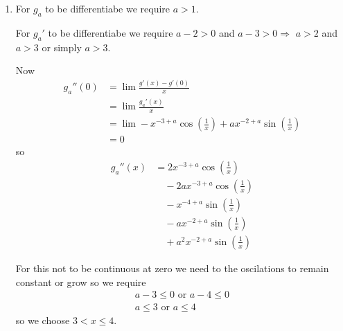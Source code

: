 \begin{enumerate}[label=(\alph*)]
    \item
    For $g_a$ to be differentiabe we require $a>1$.

    For $g_a'$ to be differentiabe we require $a-2>0$ and $a-3>0 \Rightarrow$  
    $a>2$ and $a>3$ or simply $a>3$.

    Now 
    \begin{align*}
        g_a''(0) &= \lim \frac{g'(x)-g'(0)}{x} \\
                &= \lim \frac{g_a'(x)}{x} \\
                &= \lim - x^{-3+a} \cos{\left(\frac{1}{x}\right)} + a x^{-2+a} \sin{\left(\frac{1}{x}\right)} \\
                &= 0
    \end{align*}
    so
    \begin{align*}
        g_a''(x) &= 2 x^{-3+a} \cos{\left(\frac{1}{x}\right)} \\
        &\quad - 2a x^{-3+a} \cos{\left(\frac{1}{x}\right)} \\
        &\quad - x^{-4+a} \sin{\left(\frac{1}{x}\right)} \\
        &\quad - a x^{-2+a} \sin{\left(\frac{1}{x}\right)} \\
        &\quad + a^{2} x^{-2+a} \sin{\left(\frac{1}{x}\right)}
        \end{align*}
        
        For this not to be continuous at zero we need to the oscilations to remain constant 
        or grow so we require 
        \begin{gather*}
            a-3\leq 0 \text{ or } a-4\leq 0 \\ 
            a\leq 3 \text{ or } a\leq 4
        \end{gather*}
        so we choose $3<x\leq 4$.
\end{enumerate}

